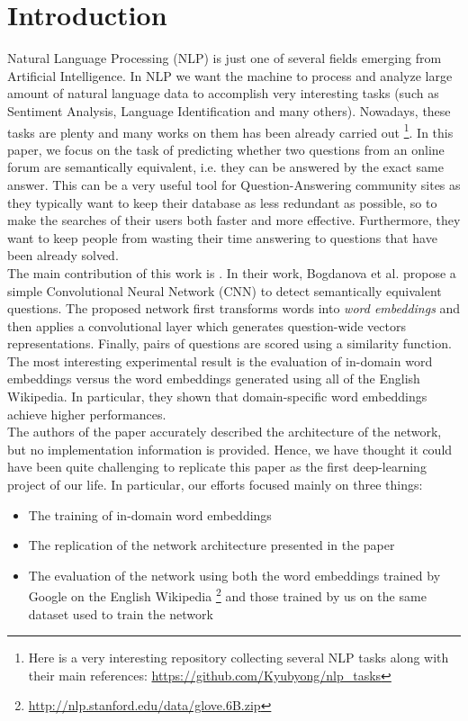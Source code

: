 \documentclass[10pt,twocolumn,letterpaper]{article}
\begin{document}
\section{Introduction}
Natural Language Processing (NLP) is just one of several fields emerging from Artificial Intelligence. In NLP we want the machine to process and analyze large amount of natural language data to accomplish very interesting tasks (such as Sentiment Analysis, Language Identification and many others). Nowadays, these tasks are plenty and many works on them has been already carried out \footnote{Here is a very interesting repository collecting several NLP tasks along with their main references: \url{https://github.com/Kyubyong/nlp_tasks}}. In this paper, we focus on the task of predicting whether two questions from an online forum are semantically equivalent, i.e. they can be answered by the exact same answer. This can be a very useful tool for Question-Answering community sites as they typically want to keep their database as less redundant as possible, so to make the searches of their users both faster and more effective. Furthermore, they want to keep people from wasting their time answering to questions that have been already solved. \\
The main contribution of this work is \cite{Bogdanova2015Detecting}. In their work, Bogdanova et al. propose a simple Convolutional Neural Network (CNN) to detect semantically equivalent questions. The proposed network first transforms words into \emph{word embeddings} and then applies a convolutional layer which generates question-wide vectors representations. Finally, pairs of questions are scored using a similarity function. The most interesting experimental result is the evaluation of in-domain word embeddings versus the word embeddings generated using all of the English Wikipedia. In particular, they shown that domain-specific word embeddings achieve higher performances. \\
The authors of the paper accurately described the architecture of the network, but no implementation information is provided. Hence, we have thought it could have been quite challenging to replicate this paper as the first deep-learning project of our life. In particular, our efforts focused mainly on three things: 
\begin{itemize}
    \item The training of in-domain word embeddings
    \item The replication of the network architecture presented in the paper
    \item The evaluation of the network using both the word embeddings trained by Google on the English Wikipedia \footnote{\url{http://nlp.stanford.edu/data/glove.6B.zip}} and those trained by us on the same dataset used to train the network
\end{itemize}
\end{document}
